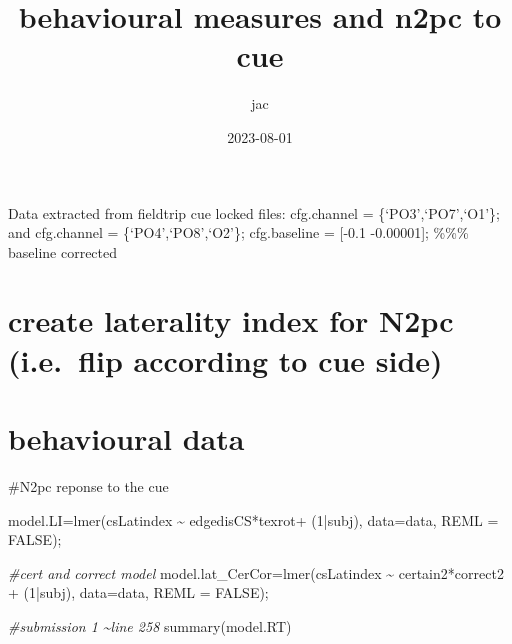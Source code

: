 \documentclass[
]{article}
\title{behavioural measures and n2pc to cue}
\author{jac}
\date{2023-08-01}
\newenvironment{Shaded}{\begin{snugshade}}{\end{snugshade}}
\newcommand{\AttributeTok}[1]{\textcolor[rgb]{0.77,0.63,0.00}{#1}}
\newcommand{\CommentTok}[1]{\textcolor[rgb]{0.56,0.35,0.01}{\textit{#1}}}
\newcommand{\ConstantTok}[1]{\textcolor[rgb]{0.00,0.00,0.00}{#1}}
\newcommand{\DecValTok}[1]{\textcolor[rgb]{0.00,0.00,0.81}{#1}}
\newcommand{\FunctionTok}[1]{\textcolor[rgb]{0.00,0.00,0.00}{#1}}
\newcommand{\NormalTok}[1]{#1}
\newcommand{\OtherTok}[1]{\textcolor[rgb]{0.56,0.35,0.01}{#1}}
\newcommand{\SpecialCharTok}[1]{\textcolor[rgb]{0.00,0.00,0.00}{#1}}
\begin{document}
\maketitle

Data extracted from fieldtrip cue locked files: cfg.channel =
\{`PO3',`PO7',`O1'\}; and cfg.channel = \{`PO4',`PO8',`O2'\};
cfg.baseline = {[}-0.1 -0.00001{]}; \%\%\% baseline corrected

\hypertarget{create-laterality-index-for-n2pc-i.e.-flip-according-to-cue-side}{%
\section{create laterality index for N2pc (i.e.~flip according to cue
side)}\label{create-laterality-index-for-n2pc-i.e.-flip-according-to-cue-side}}

\hypertarget{behavioural-data}{%
\section{behavioural data}\label{behavioural-data}}

\#N2pc reponse to the cue

\begin{Shaded}
\begin{Highlighting}[]
\NormalTok{model.LI}\OtherTok{=}\FunctionTok{lmer}\NormalTok{(csLatindex }\SpecialCharTok{\textasciitilde{}}\NormalTok{ edgedisCS}\SpecialCharTok{*}\NormalTok{texrot}\SpecialCharTok{+}\NormalTok{  (}\DecValTok{1}\SpecialCharTok{|}\NormalTok{subj), }\AttributeTok{data=}\NormalTok{data, }\AttributeTok{REML =} \ConstantTok{FALSE}\NormalTok{);}

\CommentTok{\#cert and correct model}
\NormalTok{model.lat\_CerCor}\OtherTok{=}\FunctionTok{lmer}\NormalTok{(csLatindex }\SpecialCharTok{\textasciitilde{}}\NormalTok{  certain2}\SpecialCharTok{*}\NormalTok{correct2  }\SpecialCharTok{+}\NormalTok{ (}\DecValTok{1}\SpecialCharTok{|}\NormalTok{subj), }\AttributeTok{data=}\NormalTok{data, }\AttributeTok{REML =} \ConstantTok{FALSE}\NormalTok{);}
\end{Highlighting}
\end{Shaded}

\begin{Shaded}
\begin{Highlighting}[]
\CommentTok{\#submission 1 \textasciitilde{}line 258}
\FunctionTok{summary}\NormalTok{(model.RT)}
\end{Highlighting}
\end{Shaded}
\end{document}

